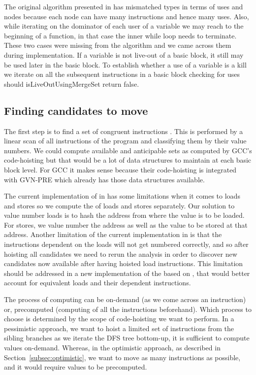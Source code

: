 \documentclass[acmlarge,review]{acmart}\settopmatter{printfolios=true}
\begin{document}
The original algorithm presented in \cite{das2012} has mismatched types in terms
of uses and nodes because each node can have many instructions and hence many
uses. Also, while iterating on the dominator of each user of a variable we may
reach to the beginning of a function, in that case the inner while loop needs to
terminate. These two cases were missing from the algorithm and we came across
them during implementation. If a variable is not live-out of a basic block, it
still may be used later in the basic block. To establish whether a use of a
variable is a kill we iterate on all the subsequent instructions in a basic
block checking for uses should isLiveOutUsingMergeSet return false.

\subsection{Finding candidates to move}
\label{subsec:finding-candidates}
The first step is to find a set of congruent instructions
\cite{briggs1997}. This is performed by a linear scan of all instructions of the
program and classifying them by their value numbers. We could compute available
and anticipable sets as computed by GCC's code-hoisting but that would be a lot
of data structures to maintain at each basic block level. For GCC it makes sense
because their code-hoisting is integrated with GVN-PRE which already has those
data structures available.

The current implementation of \GVN{} in \LLVM{} has some limitations when it
comes to loads and stores so we compute the \GVN{} of loads and stores
separately.  Our solution to value number loads is to hash the address from
where the value is to be loaded. For stores, we value number the address as well
as the value to be stored at that address. Another limitation of the current
\GVN{} implementation in \LLVM{} is that the instructions dependent on the loads
will not get numbered correctly, and so after hoisting all candidates we need to
rerun the \GVN{} analysis in order to discover new candidates now available
after having hoisted load instructions.  This limitation should be addressed in
a new implementation of the \GVN{} based on \MemorySSA{}, that would better
account for equivalent loads and their dependent instructions.

The process of computing \GVN{} can be on-demand (as we come across an
instruction) or, precomputed (computing \GVN{} of all the instructions
beforehand). Which process to choose is determined by the scope of code-hoisting
we want to perform. In a pessimistic approach, we want to hoist a limited set of
instructions from the sibling branches as we iterate the DFS tree bottom-up, it
is sufficient to compute \GVN{} values on-demand. Whereas, in the optimistic
approach, as described in Section~\ref{subsec:optimistic}, we want to move as
many instructions as possible, and it would require \GVN{} values to be
precomputed.
\end{document}
